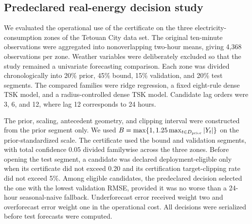 \subsection{Predeclared real-energy decision study}
We evaluated the operational use of the certificate on the three electricity-consumption zones of the Tetouan City data set. The original ten-minute observations were aggregated into nonoverlapping two-hour means, giving 4,368 observations per zone. Weather variables were deliberately excluded so that the study remained a univariate forecasting comparison. Each zone was divided chronologically into 20\% prior, 45\% bound, 15\% validation, and 20\% test segments. The compared families were ridge regression, a fixed eight-rule dense TSK model, and a radius-controlled dense TSK model. Candidate lag orders were 3, 6, and 12, where lag 12 corresponds to 24 hours.

The prior, scaling, antecedent geometry, and clipping interval were constructed from the prior segment only. We used $B=\max\{1,1.25\max_{t\in D_{\rm prior}}|Y_t|\}$ on the prior-standardized scale. The certificate used the bound and validation segments, with total confidence $0.05$ divided familywise across the three zones. Before opening the test segment, a candidate was declared deployment-eligible only when its certificate did not exceed 0.20 and its certification target-clipping rate did not exceed 5\%. Among eligible candidates, the predeclared decision selected the one with the lowest validation RMSE, provided it was no worse than a 24-hour seasonal-naive fallback. Underforecast error received weight two and overforecast error weight one in the operational cost. All decisions were serialized before test forecasts were computed.
